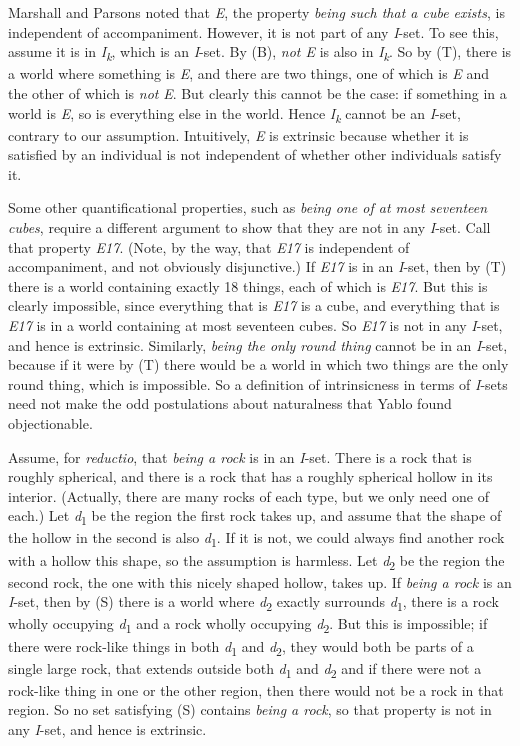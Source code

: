 \documentclass[
  10pt,
  letterpaper,
  DIV=11,
  numbers=noendperiod,
  twoside]{scrartcl}
\begin{document}
Marshall and Parsons noted that \emph{E}, the property \emph{being such
that a cube exists}, is independent of accompaniment. However, it is not
part of any \emph{I}-set. To see this, assume it is in
\emph{I\textsubscript{k}}, which is an \emph{I}-set. By (B), \emph{not
E} is also in \emph{I\textsubscript{k}}. So by (T), there is a world
where something is \emph{E}, and there are two things, one of which is
\emph{E} and the other of which is \emph{not} \emph{E}. But clearly this
cannot be the case: if something in a world is \emph{E}, so is
everything else in the world. Hence \emph{I\textsubscript{k}} cannot be
an \emph{I}-set, contrary to our assumption. Intuitively, \emph{E} is
extrinsic because whether it is satisfied by an individual is not
independent of whether other individuals satisfy it.

Some other quantificational properties, such as \emph{being one of at
most seventeen cubes}, require a different argument to show that they
are not in any \emph{I}-set. Call that property \emph{E17}. (Note, by
the way, that \emph{E17} is independent of accompaniment, and not
obviously disjunctive.) If \emph{E17} is in an \emph{I}-set, then by (T)
there is a world containing exactly 18 things, each of which is
\emph{E17}. But this is clearly impossible, since everything that is
\emph{E17} is a cube, and everything that is \emph{E17} is in a world
containing at most seventeen cubes. So \emph{E17} is not in any
\emph{I}-set, and hence is extrinsic. Similarly, \emph{being the only
round thing} cannot be in an \emph{I}-set, because if it were by (T)
there would be a world in which two things are the only round thing,
which is impossible. So a definition of intrinsicness in terms of
\emph{I}-sets need not make the odd postulations about naturalness that
Yablo found objectionable.

Assume, for \emph{reductio}, that \emph{being a rock} is in an
\emph{I}-set. There is a rock that is roughly spherical, and there is a
rock that has a roughly spherical hollow in its interior. (Actually,
there are many rocks of each type, but we only need one of each.) Let
\emph{d}\textsubscript{1} be the region the first rock takes up, and
assume that the shape of the hollow in the second is also
\emph{d}\textsubscript{1}. If it is not, we could always find another
rock with a hollow this shape, so the assumption is harmless. Let
\emph{d}\textsubscript{2} be the region the second rock, the one with
this nicely shaped hollow, takes up. If \emph{being a rock} is an
\emph{I}-set, then by (S) there is a world where
\emph{d}\textsubscript{2} exactly surrounds \emph{d}\textsubscript{1},
there is a rock wholly occupying \emph{d}\textsubscript{1} and a rock
wholly occupying \emph{d}\textsubscript{2}. But this is impossible; if
there were rock-like things in both \emph{d}\textsubscript{1} and
\emph{d}\textsubscript{2}, they would both be parts of a single large
rock, that extends outside both \emph{d}\textsubscript{1} and
\emph{d}\textsubscript{2} and if there were not a rock-like thing in one
or the other region, then there would not be a rock in that region. So
no set satisfying (S) contains \emph{being a rock}, so that property is
not in any \emph{I}-set, and hence is extrinsic.
\end{document}
